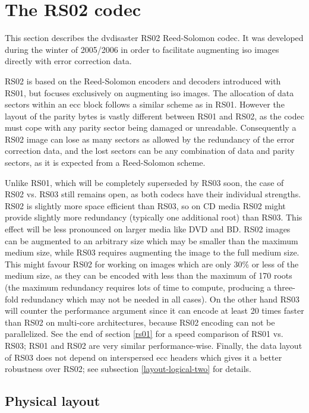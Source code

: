 \newpage
\section{The RS02 codec}

This section describes the dvdisaster RS02 Reed-Solomon codec.
It was developed during the winter of 2005/2006 in order to facilitate
augmenting iso images directly with error correction data.

RS02 is based on the Reed-Solomon encoders and decoders 
introduced with RS01, but focuses exclusively on augmenting
iso images. The allocation of data sectors within an ecc block 
follows a similar scheme as in RS01. However the layout of the
parity bytes is vastly different between RS01 and RS02, as the codec must
cope with any parity sector being damaged or unreadable. 
Consequently a RS02 image can lose as many sectors as 
allowed by the redundancy of
the error correction data, and the lost sectors can be any
combination of data and parity sectors, as it is expected from
a Reed-Solomon scheme.

\smallskip

Unlike RS01, which will be completely superseded by RS03 soon,
the case of RS02 vs. RS03 still remains open, as both codecs
have their individual strengths. RS02 is slightly more space
efficient than RS03, so on CD media RS02 might provide
slightly more redundancy (typically one additional root) than RS03. 
This effect will be less
pronounced on larger media like DVD and BD. 
RS02 images can be augmented to an arbitrary size which may
be smaller than the maximum medium size, while RS03 requires
augmenting the image to the full medium size.
This might favour RS02 for working on images which are only
30\% or less of the medium size, as they can be encoded with
less than the maximum of 170 roots 
(the maximum redundancy requires lots of time to compute, producing
a three-fold redundancy which may not be needed in all cases). 
On the other hand RS03 will counter
the performance argument since it can encode at least 
20 times faster than RS02 on multi-core architectures, 
because RS02 encoding can not be parallelized. 
See the end of section \ref{rs01}  for a speed comparison of RS01 vs. RS03; 
RS01 and RS02 are very similar performance-wise.
Finally, the data layout of RS03 does not depend on interspersed
ecc headers which gives it a better robustness over RS02;
see subsection \ref{layout-logical-two} for details.

\subsection{Physical layout}

